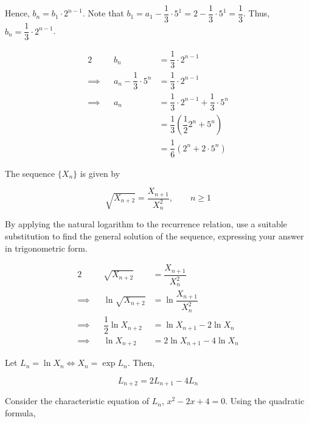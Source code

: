 \documentclass{echw}
\begin{document}
            Hence, $b_n = b_1 \cdot 2^{n-1}$. Note that $b_1 = a_1 - \dfrac13 \cdot 5^1 = 2 - \dfrac13 \cdot 5^1 = \dfrac13$. Thus, $b_n = \dfrac13 \cdot 2^{n-1}$.

            \begin{alignat*}{2}
                &&b_n &= \dfrac13 \cdot 2^{n-1}\\
                \implies&&a_n - \dfrac13 \cdot 5^n &= \dfrac13 \cdot 2^{n-1}\\
                \implies&&a_n &= \dfrac13 \cdot 2^{n-1} + \dfrac13 \cdot 5^n\\
                && &= \dfrac13 \left(\dfrac12 2^n + 5^n \right)\\
                && &= \dfrac16 \left(2^n + 2 \cdot 5^n \right)
            \end{alignat*}


    \problem{}
        The sequence $\{X_n\}$ is given by

        \begin{equation*}
            \sqrt{X_{n+2}} = \dfrac{X_{n+1}}{X_n^2}, \qquad n \geq 1
        \end{equation*}

        \noindent By applying the natural logarithm to the recurrence relation, use a suitable substitution to find the general solution of the sequence, expressing your answer in trigonometric form.

    \solution
        \begin{alignat*}{2}
            &&\sqrt{X_{n+2}} &= \dfrac{X_{n+1}}{X_n^2}\\
            \implies&&\ln \sqrt{X_{n+2}} &= \ln \dfrac{X_{n+1}}{X_n^2}\\
            \implies&&\dfrac12 \ln X_{n+2} &= \ln X_{n+1} - 2 \ln X_n\\
            \implies&&\ln X_{n+2} &= 2\ln X_{n+1} - 4\ln X_n
        \end{alignat*}

        Let $L_n = \ln X_n \iff X_n = \exp{L_n}$. Then,

        \begin{equation*}
            L_{n+2} = 2L_{n+1} - 4L_n
        \end{equation*}

        Consider the characteristic equation of $L_n$, $x^2 - 2x + 4 = 0$. Using the quadratic formula,
\end{document}
